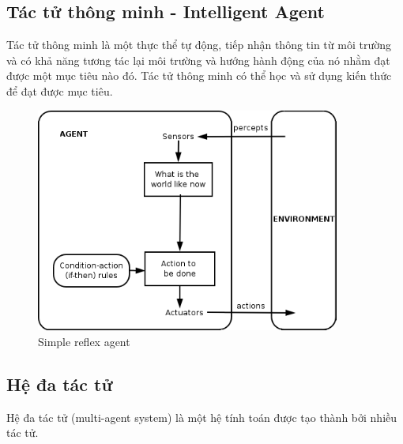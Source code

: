 \documentclass[../report.tex]{subfiles}
\begin{document}
\subsection{Tác tử thông minh - Intelligent Agent}
Tác tử thông minh là một thực thể tự động, tiếp nhận thông tin từ môi trường và có khả năng tương tác lại môi trường 
và hướng hành động của nó nhằm đạt được một mục tiêu nào đó.
Tác tử thông minh có thể học và sử dụng kiến thức để đạt được mục tiêu. \cite{intelligent-agent-wiki}

\begin{figure}[H]
\centering
\includegraphics[width=10cm]{figures/simple-reflex-agent.png}
\caption{Simple reflex agent}
\end{figure}



\subsection{Hệ đa tác tử}
Hệ đa tác tử (multi-agent system) là một hệ tính toán được tạo thành bởi nhiều tác tử. \cite{multi-agent-system-wiki}
\end{document}

